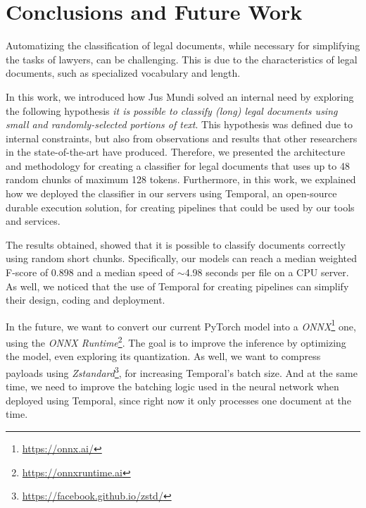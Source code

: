\documentclass[11pt]{article}
\newcommand{\anonymize}[1]{#1}
\begin{document}

\section{Conclusions and Future Work}

    Automatizing the classification of legal documents, while necessary for simplifying the tasks of lawyers, can be challenging. This is due to the characteristics of legal documents, such as specialized vocabulary and length.

    In this work, we introduced how \anonymize{Jus Mundi} solved an internal need by exploring the following hypothesis \textit{it is possible to classify (long) legal documents using small and randomly-selected portions of text}. This hypothesis was defined due to internal constraints, but also from observations and results that other researchers in the state-of-the-art have produced. Therefore, we presented the architecture and methodology for creating a classifier for legal documents that uses up to 48 random chunks of maximum 128 tokens. Furthermore, in this work, we explained how we deployed the classifier in our servers using Temporal, an open-source durable execution solution, for creating pipelines that could be used by our tools and services.

    The results obtained, showed that it is possible to classify documents correctly using random short chunks. Specifically, our models  can reach a median weighted F-score of 0.898 and a median speed of $\sim$4.98 seconds per file on a CPU server. As well, we noticed that the use of Temporal for creating pipelines can simplify their design, coding and deployment.

    In the future, we want to convert our current PyTorch model into a \textit{ONNX}\footnote{\href{https://onnx.ai/}{https://onnx.ai/}} one, using the \textit{ONNX Runtime}\footnote{\href{https://onnxruntime.ai}{https://onnxruntime.ai}}. The goal is to improve the inference by optimizing the model, even exploring its quantization. As well, we want to compress payloads using \textit{Zstandard}\footnote{\href{https://facebook.github.io/zstd/}{https://facebook.github.io/zstd/}}, for increasing Temporal's batch size. And at the same time, we need to improve the batching logic used in the neural network when deployed using Temporal, since right now it only processes one document at the time.
\end{document}
